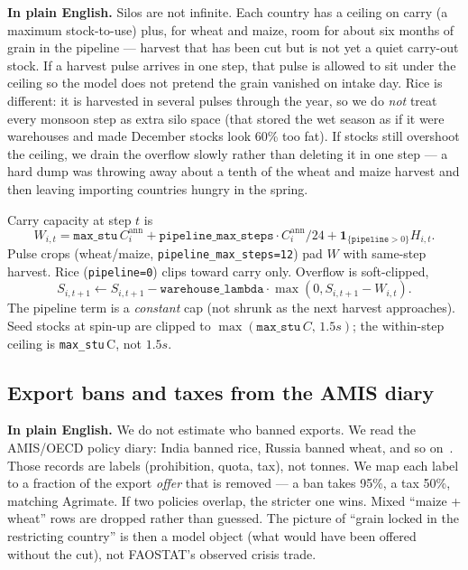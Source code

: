 \textbf{In plain English.} Silos are not infinite. Each country has a
ceiling on carry (a maximum stock-to-use) plus, for wheat and maize, room
for about six months of grain in the pipeline --- harvest that has been cut
but is not yet a quiet carry-out stock. If a harvest pulse arrives in one
step, that pulse is allowed to sit under the ceiling so the model does not
pretend the grain vanished on intake day. Rice is different: it is harvested
in several pulses through the year, so we do \emph{not} treat every monsoon
step as extra silo space (that stored the wet season as if it were
warehouses and made December stocks look 60\% too fat). If stocks still
overshoot the ceiling, we drain the overflow slowly rather than deleting it
in one step --- a hard dump was throwing away about a tenth of the wheat and
maize harvest and then leaving importing countries hungry in the spring.

Carry capacity at step $t$ is
\begin{equation}
\label{eq:warehouse}
W_{i,t}=\mathtt{max\_stu}\,C_i^{\mathrm{ann}}
+\mathtt{pipeline\_max\_steps}\cdot C_i^{\mathrm{ann}}/24
+\mathbf{1}_{\{\mathtt{pipeline}>0\}}H_{i,t}.
\end{equation}
Pulse crops (wheat/maize, \texttt{pipeline\_max\_steps=12}) pad $W$ with
same-step harvest. Rice (\texttt{pipeline=0}) clips toward carry only.
Overflow is soft-clipped,
\[
S_{i,t+1}\leftarrow S_{i,t+1}-\mathtt{warehouse\_lambda}\cdot\max(0,S_{i,t+1}-W_{i,t}).
\]
The pipeline term is a \emph{constant} cap (not shrunk as the next harvest
approaches). Seed stocks at spin-up are clipped to
$\max(\mathtt{max\_stu}\,C,\,1.5s)$; the within-step ceiling is
\texttt{max\_stu}\,C, not $1.5s$.

\subsection{Export bans and taxes from the AMIS diary}
\label{sec:amis}

\textbf{In plain English.} We do not estimate who banned exports. We read
the AMIS/OECD policy diary: India banned rice, Russia banned wheat, and so
on~\citep{amis_oecd,kuhla2025}. Those records are labels (prohibition, quota,
tax), not tonnes. We map each label to a fraction of the export \emph{offer}
that is removed --- a ban takes 95\%, a tax 50\%, matching Agrimate. If two
policies overlap, the stricter one wins. Mixed ``maize + wheat'' rows are
dropped rather than guessed. The picture of ``grain locked in the
restricting country'' is then a model object (what would have been offered
without the cut), not FAOSTAT's observed crisis trade.

